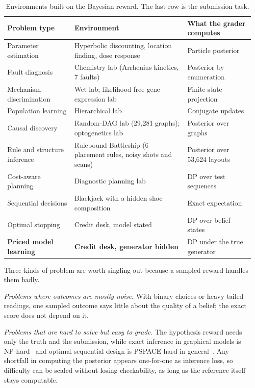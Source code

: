\documentclass[10pt]{article}
\theoremstyle{definition}
\theoremstyle{remark}
\theoremstyle{plain}
\begin{document}
\begin{table}[t]
\centering\small
\begin{tabular}{p{3.3cm}p{5.7cm}p{4.9cm}}
\toprule
Problem type & Environment & What the grader computes \\
\midrule
Parameter estimation & Hyperbolic discounting, location finding, dose response & Particle posterior \\
Fault diagnosis & Chemistry lab (Arrhenius kinetics, 7 faults) & Posterior by enumeration \\
Mechanism discrimination & Wet lab; likelihood-free gene-expression lab & Finite state projection \\
Population learning & Hierarchical lab & Conjugate updates \\
Causal discovery & Random-DAG lab (29{,}281 graphs); optogenetics lab & Posterior over graphs \\
Rule and structure inference & Rulebound Battleship (6 placement rules, noisy shots and scans) & Posterior over 53{,}624 layouts \\
Cost-aware planning & Diagnostic planning lab & DP over test sequences \\
Sequential decisions & Blackjack with a hidden shoe composition & Exact expectation \\
Optimal stopping & Credit desk, model stated & DP over belief states \\
\textbf{Priced model learning} & \textbf{Credit desk, generator hidden} & DP under the true generator \\
\bottomrule
\end{tabular}
\caption{Environments built on the Bayesian reward. The last row is the submission task.}
\label{tab:envs}
\end{table}

Three kinds of problem are worth singling out because a sampled reward handles them badly.

\emph{Problems where outcomes are mostly noise.} With binary choices or heavy-tailed readings, one
sampled outcome says little about the quality of a belief; the exact score does not depend on it.

\emph{Problems that are hard to solve but easy to grade.} The hypothesis reward needs only the
truth and the submission, while exact inference in graphical models is
NP-hard~\citep{cooper1990computational,dagum1993approximating} and optimal sequential design is
PSPACE-hard in general~\citep{papadimitriou1987complexity}. Any shortfall in computing the
posterior appears one-for-one as inference loss, so difficulty can be scaled without losing
checkability, as long as the reference itself stays computable.
\end{document}
